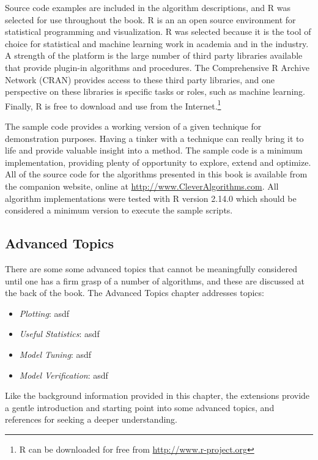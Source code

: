Source code examples are included in the algorithm descriptions, and R was selected for use throughout the book. R is an an open source environment for statistical programming and visualization. R was selected because it is the tool of choice for statistical and machine learning work in academia and in the industry. A strength of the platform is the large number of third party libraries available that provide plugin-in algorithms and procedures. The Comprehensive R Archive Network (CRAN) provides access to these third party libraries, and one perspective on these libraries is specific tasks or roles, such as machine learning. Finally, R is free to download and use from the Internet.\footnote{R can be downloaded for free from \url{http://www.r-project.org}}

The sample code provides a working version of a given technique for demonstration purposes. Having a tinker with a technique can really bring it to life and provide valuable insight into a method. The sample code is a minimum implementation, providing plenty of opportunity to explore, extend and optimize.
All of the source code for the algorithms presented in this book is available from the companion website, online at \url{http://www.CleverAlgorithms.com}. All algorithm implementations were tested with R version 2.14.0 which should be considered a minimum version to execute the sample scripts.

\subsection{Advanced Topics}
There are some some advanced topics that cannot be meaningfully considered until one has a firm grasp of a number of algorithms, and these are discussed at the back of the book. 
The Advanced Topics chapter addresses topics:

\begin{itemize}
	\item \emph{Plotting}: asdf
	\item \emph{Useful Statistics}: asdf
	\item \emph{Model Tuning}: asdf
	\item \emph{Model Verification}: asdf
\end{itemize}

Like the background information provided in this chapter, the extensions provide a gentle introduction and starting point into some advanced topics, and references for seeking a deeper understanding.

